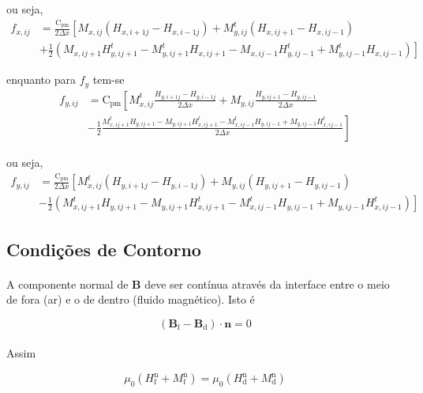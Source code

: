 \documentclass[eletromagnetismo.tex]{subfiles}
\begin{document}
ou seja,
 \begin{align}
f_{x,ij} & = \frac{\mathrm{C}_{\mathrm{pm}}}{2\Delta x}\left[M_{x,ij} (H_{x,i+1j} - H_{x,i-1j})+M_{y,ij}^t (H_{x,ij+1} - H_{x,ij-1})\right. \nonumber \\
&+\left. \tfrac{1}{2}(M_{x,ij+1} H_{y,ij+1}^t - M_{y,ij+1}^t H_{x,ij+1} - M_{x,ij-1} H_{y,ij-1}^t + M_{y,ij-1}^t H_{x,ij-1})\right]
\end{align}

enquanto para $f_y$ tem-se \begin{align}
f_{y,ij} & = \mathrm{C}_{\mathrm{pm}}\left[M_{x,ij}^t \frac{H_{y,i+1j} - H_{y,i-1j}}{2\Delta x}+M_{y,ij} \frac{H_{y,ij+1} - H_{y,ij-1}}{2\Delta x} \right. \nonumber \\
&-\left. \frac{1}{2}\frac{M_{x,ij+1}^t H_{y,ij+1} - M_{y,ij+1} H_{x,ij+1}^t - M_{x,ij-1}^t H_{y,ij-1} + M_{y,ij-1} H_{x,ij-1}^t}{2\Delta x}\right]
\end{align}

ou seja,
\begin{align}
f_{y,ij} & = \frac{\mathrm{C}_{\mathrm{pm}}}{2\Delta x}\left[M_{x,ij}^t (H_{y,i+1j} - H_{y,i-1j})+M_{y,ij} (H_{y,ij+1} - H_{y,ij-1}) \right. \nonumber \\
&-\left. \tfrac{1}{2}(M_{x,ij+1}^t H_{y,ij+1} - M_{y,ij+1} H_{x,ij+1}^t - M_{x,ij-1}^t H_{y,ij-1} + M_{y,ij-1} H_{x,ij-1}^t) \right]
\end{align}



\subsection{Condições de Contorno}
\paragraph{} A componente normal de $\mathbf{B}$ deve ser contínua através da interface entre o meio de fora (ar) e o de dentro (fluido magnético). Isto é

\begin{equation}
\left(\mathbf{B}_{\mathrm{f}} - \mathbf{B}_{\mathrm{d}}\right)\cdot \mathbf{n} = 0
\end{equation}

\paragraph{} Assim

\begin{equation}
\mu_0 (H_{\mathrm{f}}^{\mathrm{n}} + M_{\mathrm{f}}^{\mathrm{n}}) =  \mu_0(H_{\mathrm{d}}^{\mathrm{n}}+M_{\mathrm{d}}^{\mathrm{n}})
\end{equation}
\end{document}
